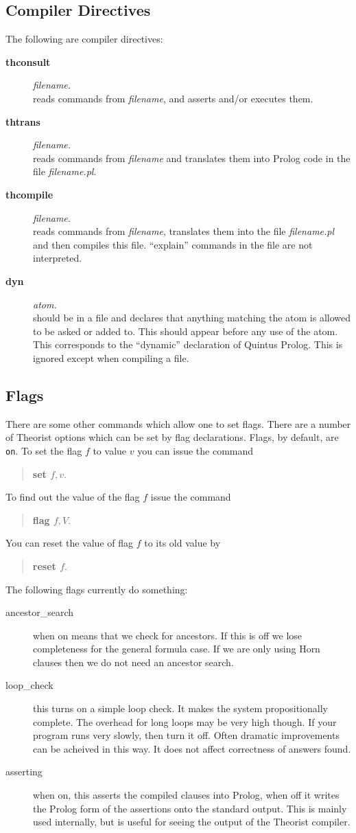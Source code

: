 \subsection{Compiler Directives}
The following are compiler directives:
\begin{description}
\item[\bf thconsult] {\em filename.}\\
reads commands from {\em filename}, and asserts and/or executes them.
\item[\bf thtrans] {\em filename.}\\
reads commands from {\em filename} and translates them into Prolog
code in the file {\em filename.pl}.
\item[\bf thcompile] {\em filename.}\\
reads commands from {\em filename}, translates them into the file
{\em filename.pl} and then compiles this file. ``explain'' commands in
the file are not interpreted.
\item[\bf dyn] {\em atom.}\\
should be in a file and declares that anything matching the atom
is allowed to be asked or added to. This should appear before any
use of the atom. This corresponds to the ``dynamic'' declaration of
Quintus Prolog. This is ignored except when compiling a file.
\end{description}
\subsection{Flags}
There are some other commands which allow one to set flags.
There are a number of Theorist options which can be set by flag declarations.
Flags, by default, are {\tt on}.
To set the flag $f$ to value $v$ you can issue the command
\begin{verse}
\bf set $f,v.$
\end{verse}
To find out the value of the flag $f$ issue the command
\begin{verse}
\bf flag $f,V.$
\end{verse}
You can reset the value of flag $f$ to its old value by
\begin{verse}
\bf reset $f.$
\end{verse}

The following flags currently do something:
\begin{description}
\item[ancestor\_search] when on means that we check for ancestors. If this is
off we lose completeness for the general formula case. If we are only using
Horn clauses then we do not need an ancestor search.
\item[loop\_check] this turns on a simple loop check. It makes the system
propositionally complete. The overhead for long loops may be very high though.
If your program runs very slowly, then turn it off. Often dramatic improvements
can be acheived in this way. It does not affect correctness of answers found.
\item[asserting] when on, this asserts the compiled clauses into Prolog,
when off it writes the Prolog form of the assertions onto the standard output.
This is mainly used internally, but is useful for seeing the output 
of the Theorist compiler.
\end{description}
